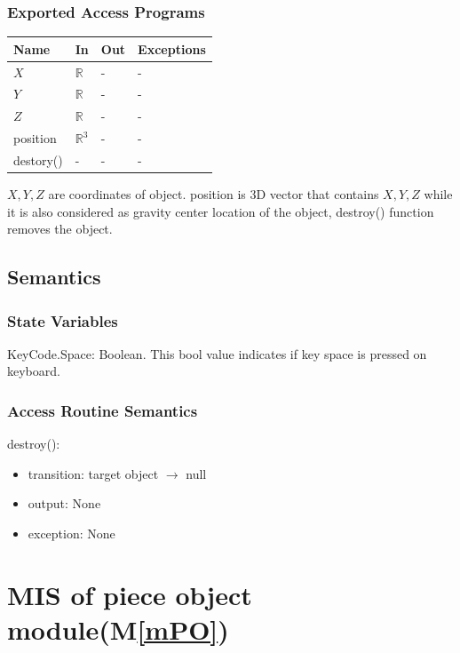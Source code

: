 \documentclass[12pt, titlepage]{article}
\newcommand{\mref}[1]{M\ref{#1}}
\begin{document}
\subsubsection{Exported Access Programs}

\begin{center}
	\begin{tabular}{p{2cm} p{4cm} p{4cm} p{2cm}}
		\hline
		\textbf{Name} & \textbf{In} & \textbf{Out} & \textbf{Exceptions} \\
		\hline
		$X$ & $\mathbb{R}$ & - & - \\
		$Y$ & $\mathbb{R}$ & - & - \\
		$Z$ & $\mathbb{R}$ & - & - \\
		position & $\mathbb{R}^{3}$ & - & - \\
		destory() & - & - & - \\
		\hline		
	\end{tabular}
\end{center}
$X,Y,Z$ are coordinates of object. position is 3D vector that contains $X,Y,Z$ while it is also considered as gravity center location of the object, destroy() function removes the object.
\subsection{Semantics}

\subsubsection{State Variables}

KeyCode.Space: Boolean.
This bool value indicates if key space is pressed on keyboard.

\subsubsection{Access Routine Semantics}

\noindent destroy():\\
\begin{itemize}
	\item transition: target object $\rightarrow$ null
	\item output: None
	\item exception: None
\end{itemize}

\section{MIS of piece object module(\mref{mPO})}
\end{document}

